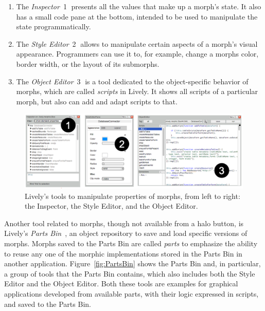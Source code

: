 \begin{enumerate}
    \item The \emph{Inspector}~\textcircled{1} presents all the values that make up a morph's state. It also has a small code pane at the bottom, intended to be used to manipulate the state programmatically.
    \item The \emph{Style Editor}~\textcircled{2} allows to manipulate certain aspects of a morph's visual appearance. Programmers can use it to, for example, change a morphs color, border width, or the layout of its submorphs.
    \item The \emph{Object Editor}~\textcircled{3} is a tool dedicated to the object-specific behavior of morphs, which are called \emph{scripts} in Lively. It shows all scripts of a particular morph, but also can add and adapt scripts to that.
\end{enumerate}

\begin{figure}[h]
    \centering
    \includegraphics[width=\textwidth]{figures/livelyTools.pdf}
    \caption{Lively's tools to manipulate properties of morphs, from left to right: the Inspector, the Style Editor, and the Object Editor.}
    \label{fig:LivelyTools}
\end{figure}

Another tool related to morphs, though not available from a halo button, is Lively's \emph{Parts Bin}~\cite{Lincke2012LPC}, an object repository to save and load specific versions of morphs.
Morphs saved to the Parts Bin are called \emph{parts} to emphasize the ability to reuse any one of the morphic implementations stored in the Parts Bin in another application.
Figure~\ref{fig:PartsBin} shows the Parts Bin and, in particular, a group of tools that the Parts Bin contains, which also includes both the Style Editor and the Object Editor.
Both these tools are examples for graphical applications developed from available parts, with their logic expressed in scripts, and saved to the Parts Bin.

